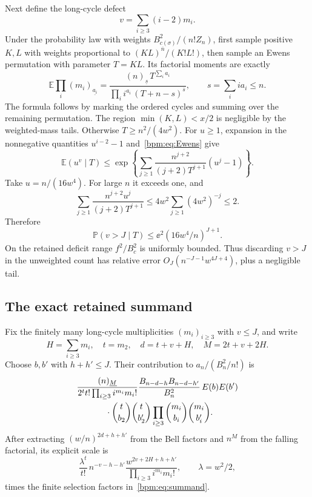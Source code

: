 \documentclass[11pt,a4paper]{article}
\theoremstyle{remark}\newtheorem{remark}[theorem]{Remark}%
\newcommand{\E}{\mathbb E}\newcommand{\Pp}{\mathbb P}
\newcommand{\fall}[2]{(#1)_{\underline{#2}}}\newcommand{\rise}[2]{(#1)^{\overline{#2}}}
\begin{document}
Next define the long-cycle defect
\[
 v=\sum_{i\ge3}(i-2)m_i.
\]
Under the probability law with weights $B_{c(\sigma)}^2/(n!Z_n)$, first sample positive $K,L$ with weights proportional to $\rise{KL}{n}/(K!L!)$, then sample an Ewens permutation with parameter $T=KL$. Its factorial moments are exactly
\begin{equation}\label{bpm:eq:Ewens}
 \E\prod_i\fall{m_i}{a_i}
 =\frac{\fall ns\,T^{\sum_i a_i}}
 {\prod_i i^{a_i}\,\rise{T+n-s}{s}},\qquad s=\sum_i ia_i\le n.
\end{equation}
The formula follows by marking the ordered cycles and summing over the remaining permutation.
The region $\min(K,L)<x/2$ is negligible by the weighted-mass tails. Otherwise $T\ge n^2/(4w^2)$. For $u\ge1$, expansion in the nonnegative quantities $u^{i-2}-1$ and~\eqref{bpm:eq:Ewens} give
\[
 \E(u^v\mid T)\le
 \exp\left\{\sum_{j\ge1}\frac{n^{j+2}}{(j+2)T^{j+1}}(u^j-1)\right\}.
\]
Take $u=n/(16w^4)$. For large $n$ it exceeds one, and
\[
 \sum_{j\ge1}\frac{n^{j+2}u^j}{(j+2)T^{j+1}}
 \le4w^2\sum_{j\ge1}(4w^2)^{-j}\le2.
\]
Therefore
\begin{equation}\label{bpm:eq:longtail}
 \Pp(v>J\mid T)\le\ee^2(16w^4/n)^{J+1}.
\end{equation}
On the retained deficit range $f^2/B_c^2$ is uniformly bounded. Thus discarding $v>J$ in the unweighted count has relative error $O_J(n^{-J-1}w^{4J+4})$, plus a negligible tail.

\subsection*{The exact retained summand}
Fix the finitely many long-cycle multiplicities $(m_i)_{i\ge3}$ with $v\le J$, and write
\[
 H=\sum_{i\ge3}m_i,\quad t=m_2,\quad d=t+v+H,\quad
 M=2t+v+2H.
\]
Choose $b,b'$ with $h+h'\le J$. Their contribution to $a_n/(B_n^2/n!)$ is
\begin{align}\label{bpm:eq:summand}
 &\frac{\fall nM}{2^t t!\prod_{i\ge3}i^{m_i}m_i!}
 \frac{B_{n-d-h}B_{n-d-h'}}{B_n^2}\,E(b)E(b')\nonumber\\
 &\hspace{12mm}\cdot\binom t{b_2}\binom t{b_2'}
 \prod_{i\ge3}\binom{m_i}{b_i}\binom{m_i}{b_i'}.
\end{align}
After extracting $(w/n)^{2d+h+h'}$ from the Bell factors and $n^M$ from the falling factorial, its explicit scale is
\begin{equation}\label{bpm:eq:scale}
 \frac{\lambda^t}{t!}\,
 n^{-v-h-h'}\frac{w^{2v+2H+h+h'}}{\prod_{i\ge3}i^{m_i}m_i!},
 \qquad\lambda=w^2/2,
\end{equation}
times the finite selection factors in~\eqref{bpm:eq:summand}.
\end{document}

